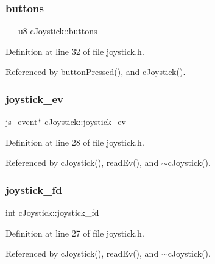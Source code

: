 \subsubsection{\texorpdfstring{buttons}{buttons}}
{\footnotesize\ttfamily \+\_\+\+\_\+u8 c\+Joystick\+::buttons\hspace{0.3cm}{\ttfamily [private]}}



Definition at line 32 of file joystick.\+h.



Referenced by button\+Pressed(), and c\+Joystick().

\mbox{\label{classc_joystick_ae4af08aaa67a7f0c0575d65ff4987017}} 
\subsubsection{\texorpdfstring{joystick\+\_\+ev}{joystick\_ev}}
{\footnotesize\ttfamily js\+\_\+event$\ast$ c\+Joystick\+::joystick\+\_\+ev\hspace{0.3cm}{\ttfamily [private]}}



Definition at line 28 of file joystick.\+h.



Referenced by c\+Joystick(), read\+Ev(), and $\sim$c\+Joystick().

\mbox{\label{classc_joystick_a23bb9ae8f441e6974b383aae6ae8bea6}} 
\subsubsection{\texorpdfstring{joystick\+\_\+fd}{joystick\_fd}}
{\footnotesize\ttfamily int c\+Joystick\+::joystick\+\_\+fd\hspace{0.3cm}{\ttfamily [private]}}



Definition at line 27 of file joystick.\+h.



Referenced by c\+Joystick(), read\+Ev(), and $\sim$c\+Joystick().

\mbox{\label{classc_joystick_a6962bb01a3326201b9cf3ba403fe0f21}} 
